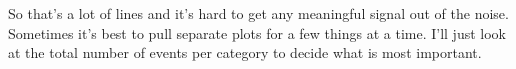 \documentclass[11pt]{article}
\begin{document}
    \begin{center}
    \end{center}
    { \hspace*{\fill} \\}
    
    \begin{center}
    \end{center}
    { \hspace*{\fill} \\}
    
    So that's a lot of lines and it's hard to get any meaningful signal out
of the noise. Sometimes it's best to pull separate plots for a few
things at a time. I'll just look at the total number of events per
category to decide what is most important.
\end{document}
